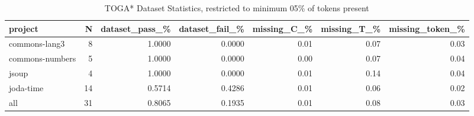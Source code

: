 \begin{table*}
\centering
\caption{TOGA* Dataset Statistics, restricted to minimum 05\% of tokens present}
\label{tab:toga_stats_05}
\begin{tabular}{lrrrrrr}
\toprule
         project &   N &  dataset\_pass\_\% &  dataset\_fail\_\% &  missing\_C\_\% &  missing\_T\_\% &  missing\_token\_\% \\
\midrule
   commons-lang3 &   8 &          1.0000 &          0.0000 &         0.01 &         0.07 &             0.03 \\
 commons-numbers &   5 &          1.0000 &          0.0000 &         0.00 &         0.07 &             0.04 \\
           jsoup &   4 &          1.0000 &          0.0000 &         0.01 &         0.14 &             0.04 \\
       joda-time &  14 &          0.5714 &          0.4286 &         0.01 &         0.06 &             0.02 \\
             all &  31 &          0.8065 &          0.1935 &         0.01 &         0.08 &             0.03 \\
\bottomrule
\end{tabular}
\end{table*}
